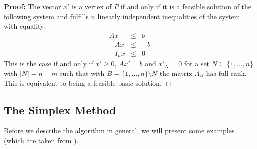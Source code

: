 \documentclass[12pt, showidx, twoside]{article}
\def\OnlineVersion{}
\def\prove{\par \noindent \hbox{\bf Proof:}\quad}
\def\endproof{\hfill{$\Box$}}
\def\R{\mathbb{R}}
\begin{document}
{{{\prove 
The vector $x'$ is a vertex of $P$ if and only if it is a
feasible solution of the following system and fulfills
$n$ linearly independent inequalities of the system with equality:
\[
   \begin{array}{rcl}
   Ax     & \leq & b\\
  -Ax     & \leq & -b\\
   -I_n x & \leq & 0
\end{array}
\]
This is the case if and only if $x'\geq 0$, 
$Ax' = b$ and $x'_{N} = 0$ for a set 
$N \subseteq \{1,\dots,n\}$ with $|N| = n - m$ such
that with $B = \{1,\dots,n\}\setminus N$ the 
matrix $A_B$ has full rank.
This is equivalent to being a feasible basic solution.
\endproof





\subsection{The Simplex Method}
\label{sec:simplex-tableau}
Before we describe the algorithm in general, we will present
some examples (which are taken from \cite{MatG07}).

}}}
\end{document}
